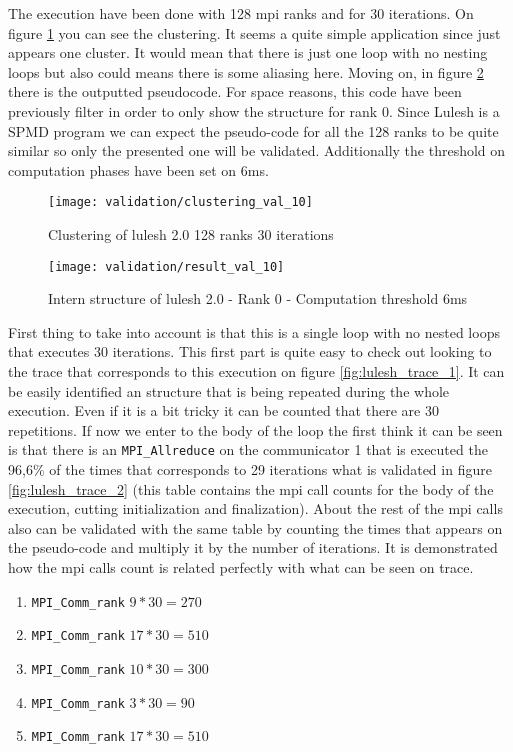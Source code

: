 The execution have been done with 128 mpi ranks and for 30 iterations. On figure
\ref{fig:clustering_val_10} you can see the clustering. It seems a quite simple
application since just appears one cluster. It would mean that there is just one
loop with no nesting loops but also could means there is some aliasing here. 
Moving on, in figure \ref{fig:result_val_10} there is the outputted pseudocode.
For space reasons, this code have been previously filter in order to only show
the structure for rank 0. Since Lulesh is a SPMD program we can expect the
pseudo-code for all the 128 ranks to be quite similar so only the presented one
will be validated. Additionally the threshold on computation phases have been
set on 6ms.

\begin{figure}
  \centering
  \texttt{[image: validation/clustering\_val\_10]}
  \caption{Clustering of lulesh 2.0 128 ranks 30 iterations}
  \label{fig:clustering_val_10}
\end{figure}

\begin{figure}
    \centering
    \texttt{[image: validation/result\_val\_10]}
    \caption{Intern structure of lulesh 2.0 - Rank 0 - Computation threshold 6ms}
    \label{fig:result_val_10}
\end{figure}

First thing to take into account is that this is a single
loop with no nested loops that executes 30 iterations. This first part is quite
easy to check out looking to the trace that corresponds to this execution on
figure \ref{fig:lulesh_trace_1}. It can be easily identified an structure that
is being repeated during the whole execution. Even if it is a bit tricky it can
be counted that there are 30 repetitions.
If now we enter to the body of the loop the first think it can be seen is that
there is an \texttt{MPI\_Allreduce} on the communicator 1 that is executed the
96,6\% of the times that corresponds to 29 iterations what is validated in
figure \ref{fig:lulesh_trace_2} (this table contains the mpi call counts for the
body of the execution, cutting initialization and finalization). About the rest 
of the mpi calls also can be
validated with the same table by counting the times that appears on the
pseudo-code and multiply it by the number of iterations. It is demonstrated how
the mpi calls count is related perfectly with what can be seen on trace.
\begin{enumerate}[label=\roman*)]
  \item \texttt{MPI\_Comm\_rank} $9*30=270$
  \item \texttt{MPI\_Comm\_rank} $17*30=510$
  \item \texttt{MPI\_Comm\_rank} $10*30=300$
  \item \texttt{MPI\_Comm\_rank} $3*30=90$
  \item \texttt{MPI\_Comm\_rank} $17*30=510$
\end{enumerate}

